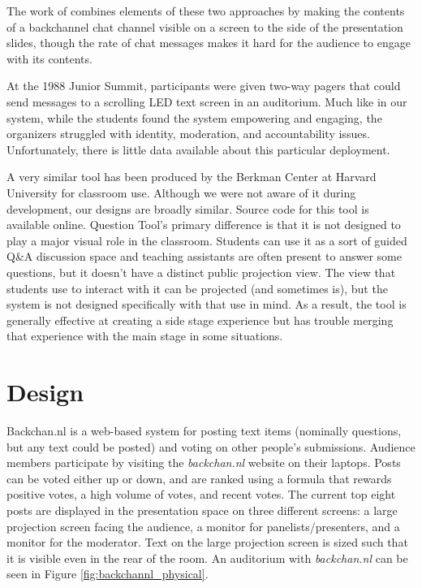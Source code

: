 The work of \citet{Rekimoto:1998jy} combines elements of these two approaches by making the contents of a backchannel chat channel visible on a screen to the side of the presentation slides, though the rate of chat messages makes it hard for the audience to engage with its contents. 

At the 1988 Junior Summit, participants were given two-way pagers that could send messages to a scrolling LED text screen in an auditorium. Much like in our system, while the students found the system empowering and engaging, the organizers struggled with identity, moderation, and accountability issues. Unfortunately, there is little data available about this particular deployment. \citep{Chesnais:uh}

A very similar tool has been produced by the Berkman Center at Harvard University for classroom use. Although we were not aware of it during development, our designs are broadly similar. Source code for this tool is available online. \citep{Anonymous:DYsIxdHV} Question Tool's primary difference is that it is not designed to play a major visual role in the classroom. Students can use it as a sort of guided Q&A discussion space and teaching assistants are often present to answer some questions, but it doesn't have a distinct public projection view. The view that students use to interact with it can be projected (and sometimes is), but the system is not designed specifically with that use in mind. As a result, the tool is generally effective at creating a side stage experience but has trouble merging that experience with the main stage in some situations. 


\section{Design}

Backchan.nl is a web-based system for posting text items (nominally questions, but any text could be posted) and voting on other people's submissions. Audience members participate by visiting the \emph{backchan.nl} website on their laptops. Posts can be voted either up or down, and are ranked using a formula that rewards positive votes, a high volume of votes, and recent votes. The current top eight posts are displayed in the presentation space on three different screens: a large projection screen facing the audience, a monitor for panelists/presenters, and a monitor for the moderator. Text on the large projection screen is sized such that it is visible even in the rear of the room. An auditorium with \emph{backchan.nl} can be seen in Figure \ref{fig:backchannl_physical}. 

